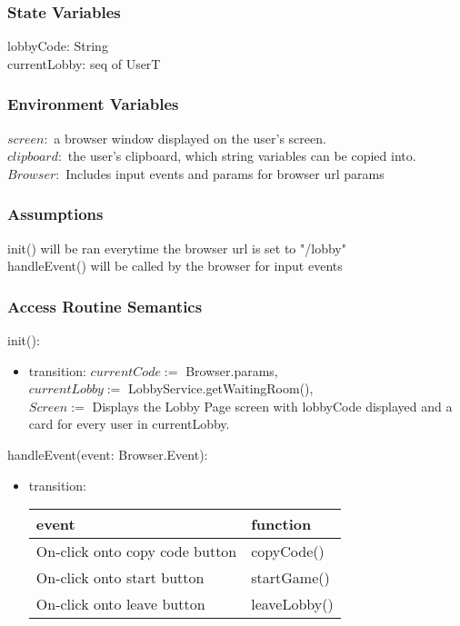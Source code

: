 \documentclass[12pt, titlepage]{article}
\begin{document}
\subsubsection{State Variables}

lobbyCode: String\\
currentLobby: seq of UserT

\subsubsection{Environment Variables}

$screen: $ a browser window displayed on the user's screen. \\
$clipboard: $ the user's clipboard, which string variables can be copied into.\\
$Browser: $ Includes input events and params for browser url params

\subsubsection{Assumptions}

init() will be ran everytime the browser url is set to "/lobby"\\
handleEvent() will be called by the browser for input events

\subsubsection{Access Routine Semantics}

\noindent init():
\begin{itemize}
\item transition: $currentCode := $ Browser.params,\\
$currentLobby :=$ LobbyService.getWaitingRoom(),\\
$Screen := $ Displays the Lobby Page screen with lobbyCode displayed and a card for every user in currentLobby.
\end{itemize}



\noindent handleEvent(event: Browser.Event):
\begin{itemize}
\item transition: \begin{tabular}{p{5cm} p{4cm}}
\hline
\textbf{event} & \textbf{function} \\
\hline
On-click onto copy code button & copyCode() \\
On-click onto start button & startGame() \\
On-click onto leave button & leaveLobby() \\
\hline
\end{tabular}
    
\end{itemize}
\end{document}
